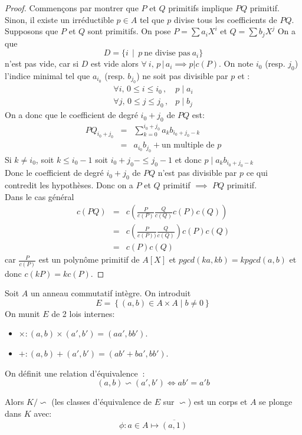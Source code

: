 \begin{proof}
	Commençons par montrer que $P$ et $Q$ primitifs implique $PQ$ primitif. \\
	Sinon, il existe un irréductible $p \in A $ tel que $p$ divise tous les coefficients de $PQ$. \\
	Supposons que $P$ et $Q$ sont primitifs. On pose $P = \sum a_iX^i$ et  $Q = \sum b_jX^j$
	On a que $$D = \{i \,\mid \, p\  \text{ne divise pas}\  a_i \}$$ n'est pas vide, car si $D$ est vide alors $ \forall\  i,\, p \,|\, a_i \implies p | c(P)$.
	On note $i_0$ (resp. $j_0$) l'indice minimal tel que $a_{i_0}$ (resp. $b_{j_0}$) ne soit pas divisible par $p$ et :
	\begin{eqnarray*}
		\forall i, \, 0 \leq i \leq i_0\,,& p \mid a_i \\
		\forall j, \, 0 \leq j \leq j_0\,,& p \mid b_j
	\end{eqnarray*}
	On a donc que le coefficient de degré $i_0 + j_0$ de $PQ$ est:
	\begin{eqnarray*}
		PQ_{i_0+j_0}&=& \sum\limits^{i_0 + j_0}_{k=0} a_k b_{i_0 + j_0 - k} \\
		&=& a_{i_0}b_{j_0} + \text{un multiple de } p
	\end{eqnarray*}
	Si $k \neq i_0$, soit  $k\leq i_0 -1$ soit $i_0+j_0 - \leq j_0 -1$ et donc $ p \mid a_kb_{i_0 + j_0 - k}$\\
	Donc le coefficient de degré $i_0+j_0$ de $PQ$ n'est pas divisible par $p$ ce qui contredit les hypothèses.
	Donc on a $P$ et $Q$ primitif $\implies$ $PQ$ primitif. \\
	Dans le cas général
	\begin{eqnarray*}
		c(PQ) &=& c\left(\frac{P}{c(P)}\frac{Q}{c(Q)}c(P)c(Q)\right)\\
		&=& c\left(\frac{P}{c(P))}\frac{Q}{c(Q)}\right)c(P)c(Q)\\
		&=& c(P)c(Q)
	\end{eqnarray*}
	car $\frac{P}{c(P)}$ est un polynôme primitif de $A[X]$ et
	$pgcd(ka, kb) = k pgcd(a,b)$ et donc $c(kP) = kc(P)$.
\end{proof}


\begin{definition}
	Soit $A$ un anneau  commutatif intègre.
	On introduit
	$$E = \left\{ (a,b) \in A\times A \mid b \neq 0 \right\}$$
	On munit  $E$ de 2 lois internes:
	\begin{itemize}
		\item $\times : (a,b) \times (a', b') = (aa',bb')$.
		\item $+ : (a,b) + (a', b') = (ab' + ba',bb')$.
	\end{itemize}

	On définit une relation d'équivalence $~$:
	$$ (a,b) \backsim  (a',b') \iff ab' = a'b $$

	Alors $K/\backsim $ (les classes d'équivalence de $E$ sur $\backsim$) est un corps et $A$ se plonge dans $K$ avec:
	$$\phi : a \in A  \mapsto \overline{(a,1)}$$
\end{definition}

